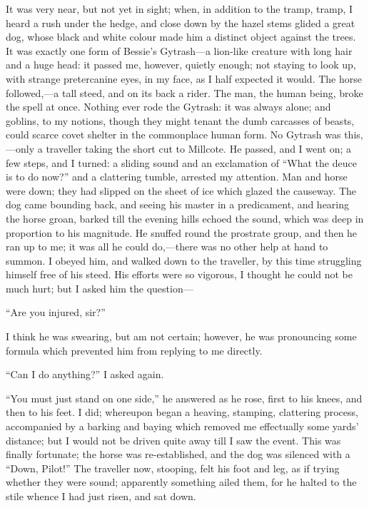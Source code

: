 It was very near, but not yet in sight; when, in addition to the tramp,
tramp, I heard a rush under the hedge, and close down by the hazel stems
glided a great dog, whose black and white colour made him a distinct
object against the trees. It was exactly one form of Bessie's
Gytrash---a lion-like creature with long hair and a huge head: it passed
me, however, quietly enough; not staying to look up, with strange
pretercanine eyes, in my face, as I half expected it would. The horse
followed,---a tall steed, and on its back a rider. The man, the human
being, broke the spell at once. Nothing ever rode the Gytrash: it was
always alone; and goblins, to my notions, though they might tenant the
dumb carcasses of beasts, could scarce covet shelter in the commonplace
human form. No Gytrash was this,---only a traveller taking the short
cut to Millcote. He passed, and I went on; a few steps, and I turned: a
sliding sound and an exclamation of \enquote{What the deuce is to do
now?} and a clattering tumble, arrested my attention. Man and horse
were down; they had slipped on the sheet of ice which glazed the
causeway. The dog came bounding back, and seeing his master in a
predicament, and hearing the horse groan, barked till the evening hills
echoed the sound, which was deep in proportion to his magnitude. He
snuffed round the prostrate group, and then he ran up to me; it was all
he could do,---there was no other help at hand to summon. I obeyed him,
and walked down to the traveller, by this time struggling himself free
of his steed. His efforts were so vigorous, I thought he could not be
much hurt; but I asked him the question---

\enquote{Are you injured, sir?}

I think he was swearing, but am not certain; however, he was pronouncing
some formula which prevented him from replying to me directly.

\enquote{Can I do anything?} I asked again.

\enquote{You must just stand on one side,} he answered as he rose, first
to his knees, and then to his feet. I did; whereupon began a heaving,
stamping, clattering process, accompanied by a barking and baying which
removed me effectually some yards' distance; but I would not be driven
quite away till I saw the event. This was finally fortunate; the horse
was re-established, and the dog was silenced with a \enquote{Down,
Pilot!} The traveller now, stooping, felt his foot and leg, as if
trying whether they were sound; apparently something ailed them, for he
halted to the stile whence I had just risen, and sat down.

